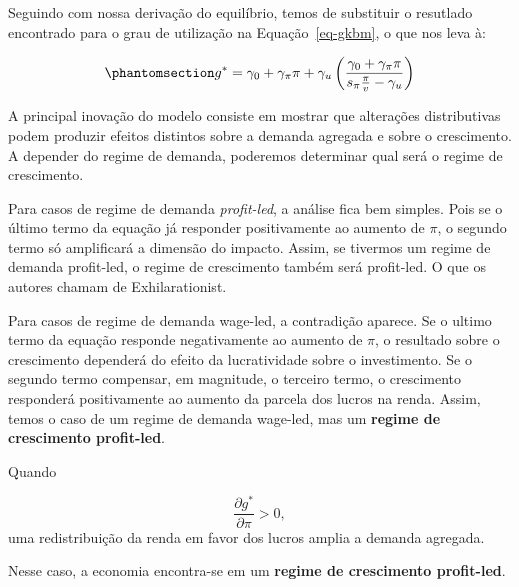 \documentclass[
  brazilian,
  letterpaper,
  DIV=11,
  numbers=noendperiod]{scrreprt}
\begin{document}
Seguindo com nossa derivação do equilíbrio, temos de substituir o
resutlado encontrado para o grau de utilização na Equação~\ref{eq-gkbm},
o que nos leva à:

\begin{equation}\protect\phantomsection\label{eq-g-bm}{g^*=\gamma_0 + \gamma_{\pi}\pi +\gamma_u \left(\frac{\gamma_0+\gamma_\pi \pi}{s_\pi\frac{\pi}{v}-\gamma_u}\right)}\end{equation}

A principal inovação do modelo consiste em mostrar que alterações
distributivas podem produzir efeitos distintos sobre a demanda agregada
e sobre o crescimento. A depender do regime de demanda, poderemos
determinar qual será o regime de crescimento.

Para casos de regime de demanda \emph{profit-led}, a análise fica bem
simples. Pois se o último termo da equação já responder positivamente ao
aumento de \(\pi\), o segundo termo só amplificará a dimensão do
impacto. Assim, se tivermos um regime de demanda profit-led, o regime de
crescimento também será profit-led. O que os autores chamam de
Exhilarationist.

Para casos de regime de demanda wage-led, a contradição aparece. Se o
ultimo termo da equação responde negativamente ao aumento de \(\pi\), o
resultado sobre o crescimento dependerá do efeito da lucratividade sobre
o investimento. Se o segundo termo compensar, em magnitude, o terceiro
termo, o crescimento responderá positivamente ao aumento da parcela dos
lucros na renda. Assim, temos o caso de um regime de demanda wage-led,
mas um \textbf{regime de crescimento profit-led}.

\begin{tcolorbox}[enhanced jigsaw, arc=.35mm, bottomrule=.15mm, bottomtitle=1mm, breakable, colback=white, colbacktitle=quarto-callout-note-color!10!white, colframe=quarto-callout-note-color-frame, coltitle=black, left=2mm, leftrule=.75mm, opacityback=0, opacitybacktitle=0.6, rightrule=.15mm, title=\textcolor{quarto-callout-note-color}{\faInfo}\hspace{0.5em}{Regime de crescimento \emph{profit-led}}, titlerule=0mm, toprule=.15mm, toptitle=1mm]

Quando

\[\frac{\partial g^{*}}{\partial\pi}>0,\] uma redistribuição da renda em
favor dos lucros amplia a demanda agregada.

Nesse caso, a economia encontra-se em um \textbf{regime de crescimento
profit-led}.

\end{tcolorbox}
\end{document}
